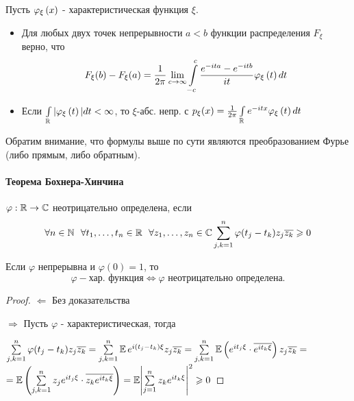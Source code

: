 \begin{theorem}[Об обращении (б/д)]  Пусть $\varphi_{\xi}\left({x}\right)$ - характеристическая функция $\xi$. \end{theorem} 

\begin{itemize}
    \item Для любых двух точек непрерывности $a < b$ функции распределения $F_\xi$ верно, что  
    $$
    F_\xi(b) - F_\xi(a) = \frac{1}{2\pi}\lim\limits_{c \to \infty}\int\limits_{-c}^c \frac{e^{-ita} - e^{-itb}}{it} \varphi_{\xi}\left({t}\right)dt
    $$
    \item Если $\int\limits_{\mathbb{R}} |\varphi_{\xi}\left({t}\right)| dt < \infty$, то $\xi$-абс. непр. с $p_\xi(x) = \frac{1}{2\pi} \int\limits_{\mathbb{R}} e^{-itx} \varphi_{\xi}\left({t}\right) dt$
\end{itemize}

\begin{lemmanote} 

Обратим внимание, что формулы выше по сути являются преобразованием Фурье (либо прямым, либо обратным).

\end{lemmanote} 

\paragraph*{Теорема Бохнера-Хинчина}

\begin{definition}  $\varphi: \mathbb{R} \to \mathbb{C}$ неотрицательно определена, если 
$$
\forall n \in \mathbb{N} \ \ \forall t_1, \ldots, t_n \in \mathbb{R} \ \  \forall z_1, \ldots, z_n \in \mathbb{C} \sum\limits_{j, k = 1}^n \varphi(t_j - t_k)z_j\overline{z_k} \geqslant 0
$$ \end{definition} 

\begin{theorem}  

Если $\varphi$ непрерывна и $\varphi(0) = 1$, то 
\[\varphi - \text{хар. функция} \Leftrightarrow \varphi \text{ неотрицательно определена.}\] 

\end{theorem} 

\begin{proof} 
$\Longleftarrow$ Без доказательства

$\Longrightarrow$ Пусть $\varphi$ - характеристическая, тогда

$   \sum\limits_{j, k = 1}^n \varphi(t_j - t_k)z_j\overline{z_k} = \sum\limits_{j, k = 1}^n \operatorname{\mathbb{E}} e^{i(t_j - t_k)\xi}z_j\overline{z_k} = \sum\limits_{j, k = 1}^n \operatorname{\mathbb{E}} \left({e^{it_j\xi} \cdot \overline{e^{it_k\xi}}}\right)z_j\overline{z_k} =$ \\
    $= \operatorname{\mathbb{E}}\left({\sum\limits_{j, k = 1}^n z_j e^{it_j\xi} \cdot \overline{z_k e^{it_k\xi}}}\right) = \operatorname{\mathbb{E}}\Biggl|\sum\limits_{j = 1}^n z_k e^{it_k\xi}\Biggr|^2 \geqslant 0
$
\end{proof}